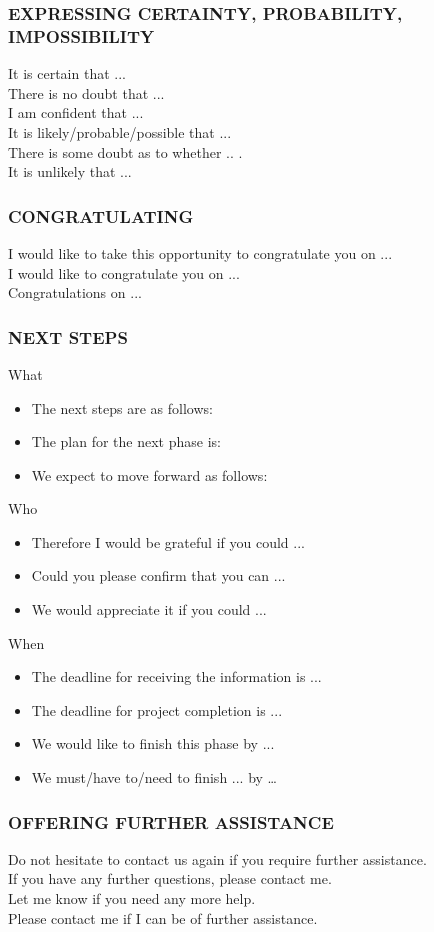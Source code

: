\subsubsection{EXPRESSING CERTAINTY, PROBABILITY, IMPOSSIBILITY}
It is certain that ...\\
There is no doubt that ...\\
I am confident that ...\\
It is likely/probable/possible that ...\\
There is some doubt as to whether .. .\\
It is unlikely that ...\\
\subsubsection{CONGRATULATING}
I would like to take this opportunity to congratulate you on ...\\
I would like to congratulate you on ...\\
Congratulations on ...\\
\subsubsection{NEXT STEPS}
What
\begin{itemize}
\item The next steps are as follows:
\item The plan for the next phase is:
\item We expect to move forward as follows:
\end{itemize}
Who
\begin{itemize}
\item Therefore I would be grateful if you could ...
\item Could you please confirm that you can ...
\item We would appreciate it if you could ...
\end{itemize}
When
\begin{itemize}
\item The deadline for receiving the information is ...
\item The deadline for project completion is ...
\item We would like to finish this phase by ...
\item We must/have to/need to finish ... by …
\end{itemize}
\subsubsection{OFFERING FURTHER ASSISTANCE}
Do not hesitate to contact us again if you require further assistance.\\
If you have any further questions, please contact me.\\
Let me know if you need any more help.\\
Please contact me if I can be of further assistance.\\
